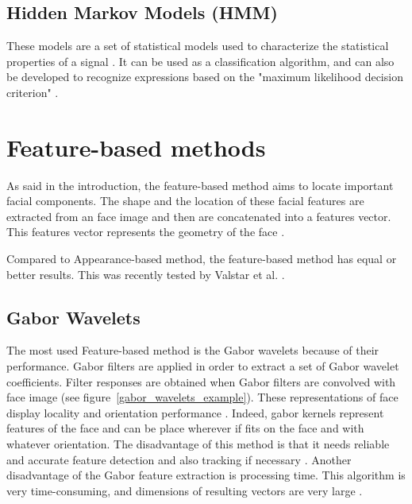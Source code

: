 \subsection{Hidden Markov Models (HMM)}

\vspace{\baselineskip}
\noindent These models are a set of statistical models used to characterize the statistical properties of a signal \cite{RAB93}. It can be used as a classification algorithm, and can also be developed to recognize expressions based on the "maximum likelihood decision criterion" \cite{LIE98}.
\newline

\section{Feature-based methods}

\noindent As said in the introduction, the feature-based method aims to locate important facial components. The shape and the location of these facial features are extracted from an face image and then are concatenated into a features vector. This features vector represents the geometry of the face \cite{SHA09}.
\newline

\noindent Compared to Appearance-based method, the feature-based method has equal or better results. This was recently tested by Valstar et al. \cite{VAL05} \cite{VAL06}.
\newline

\subsection{Gabor Wavelets}

\vspace{\baselineskip}
\noindent The most used Feature-based method is the Gabor wavelets because of their performance. Gabor filters are applied in order to extract a set of Gabor wavelet coefficients. Filter responses are obtained when Gabor filters are convolved with face image (see figure~\ref{gabor_wavelets_example}). These representations of face display locality and orientation performance \cite{JEM09}. Indeed, gabor kernels represent features of the face and can be place wherever if fits on the face and with whatever orientation. The disadvantage of this method is that it needs reliable and accurate feature detection and also tracking if necessary \cite{SHA09}. Another disadvantage of the Gabor feature extraction is processing time. This algorithm is very time-consuming, and dimensions of resulting vectors are very large \cite{PRA09}.
\newline

